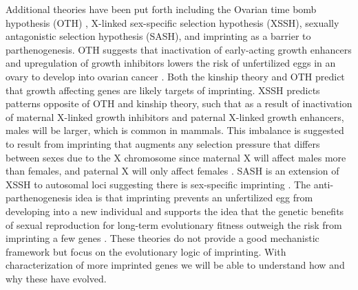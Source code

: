 Additional theories have been put forth including the Ovarian time bomb hypothesis (OTH) , X-linked sex-specific selection hypothesis (XSSH), sexually antagonistic selection hypothesis (SASH), and imprinting as a barrier to parthenogenesis. OTH suggests that inactivation of early-acting growth enhancers and upregulation of growth inhibitors lowers the risk of unfertilized eggs in an ovary to develop into ovarian cancer \citep{Morison2005,Jirtle:2007jm}. Both the kinship theory and OTH predict that growth affecting genes are likely targets of imprinting. XSSH predicts patterns opposite of OTH and kinship theory, such that as a result of inactivation of maternal X-linked growth inhibitors and paternal X-linked growth enhancers, males will be larger, which is common in mammals. This imbalance is suggested to result from imprinting that augments any selection pressure that differs between sexes due to the X chromosome since maternal X will affect males more than females, and paternal X will only affect females \citep{Morison2005}. SASH is an extension of XSSH to autosomal loci suggesting there is sex-specific imprinting \citep{Morison2005}. The anti-parthenogenesis idea is that imprinting prevents an unfertilized egg from developing into a new individual and supports the idea that the genetic benefits of sexual reproduction for long-term evolutionary fitness outweigh the risk from imprinting a few genes \citep{Jirtle:2007jm,Kono:2006jj}. These theories do not provide a good mechanistic framework but focus on the evolutionary logic of imprinting. With characterization of more imprinted genes we will be able to understand how and why these have evolved. 
 
